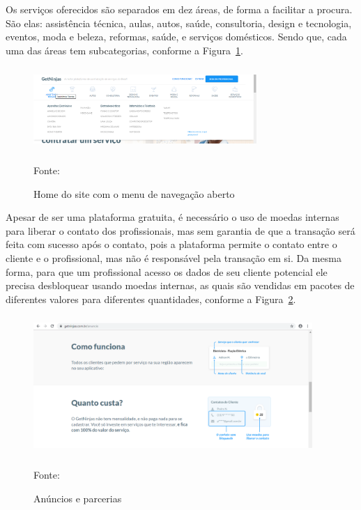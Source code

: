 Os serviços oferecidos são separados em dez áreas, de forma a facilitar a procura. São elas: assistência técnica, aulas, autos, saúde, consultoria, design e tecnologia, eventos, moda e beleza, reformas, saúde, e serviços domésticos. Sendo que, cada uma das áreas tem subcategorias, conforme a Figura~\hypersetup{linkcolor=black}\ref{fig:navegação}.

\begin{figure}[!h]
	\centering
	\caption{Home do site com o menu de navegação aberto}
	\includegraphics[width=320px, height=120px]{./images/getninjas2.png}
	\label{fig:navegação}
	\par {Fonte: \cite{get-ninjas}}
\end{figure}


Apesar de ser uma plataforma gratuita, é necessário o uso de moedas internas para liberar o contato dos profissionais, mas sem garantia de que a transação será feita com sucesso após o contato, pois a plataforma permite o contato entre o cliente e o profissional, mas não é responsável pela transação em si. Da mesma forma, para que um profissional acesso os dados de seu cliente potencial ele precisa desbloquear usando moedas internas, as quais são vendidas em pacotes de diferentes valores para diferentes quantidades, conforme a Figura~\hypersetup{linkcolor=black}\ref{fig:Anúncios}.

\begin{figure}[!h]
	\centering
	\caption{Anúncios e parcerias }
	\includegraphics[width=400px, height=200px]{./images/getninjas3.png}
		\label{fig:Anúncios}
	\par {Fonte: \cite{get-ninjas-a}}
\end{figure}


